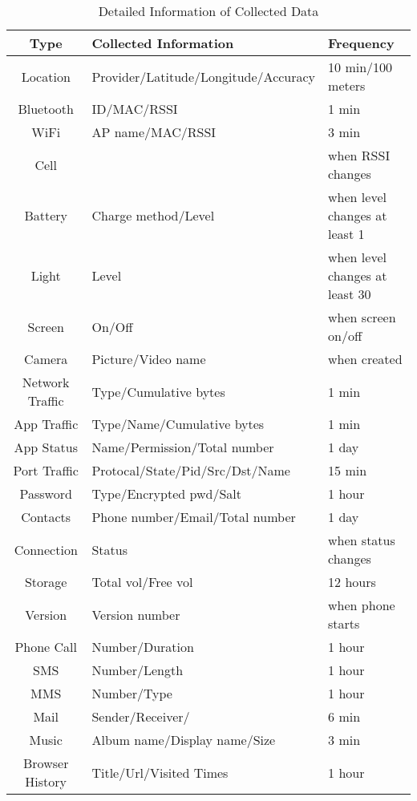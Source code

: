 \begin{table}[ht] 
\caption{Detailed Information of Collected Data } 
\centering  
\begin{tabular}{c|l|l}
\hline
		  Type			& Collected Information 					& Frequency \\ [0.5ex] 
\hline\hline Location			& Provider/Latitude/Longitude/Accuracy		& 10 min/100 meters	\\ 
\hline	  Bluetooth 		& ID/MAC/RSSI	    						& 1 min \\
\hline 	  WiFi 			& AP name/MAC/RSSI					& 3 min \\
\hline 	  Cell   			& 									& when RSSI changes \\
\hline	  Battery			& Charge method/Level	    				& when level changes at least 1 \\
\hline	  Light			& Level	    							& when level changes at least 30 \\
\hline	  Screen			& On/Off 							 	& when screen on/off \\
\hline 	  Camera			& Picture/Video name			        	        & when created	 \\
\hline 	  Network Traffic 	& Type/Cumulative bytes					& 1 min	 \\
\hline	  App Traffic		& Type/Name/Cumulative bytes			& 1 min \\
\hline	  App Status 		& Name/Permission/Total number			& 1 day \\
\hline 	  Port Traffic	        & Protocal/State/Pid/Src/Dst/Name			& 15 min \\
\hline 	  Password	  	& Type/Encrypted pwd/Salt				& 1 hour \\
\hline 	  Contacts			& Phone number/Email/Total number		& 1 day \\
\hline 	  Connection		& Status								& when status changes \\
\hline 	  Storage			& Total vol/Free vol						& 12 hours \\
\hline 	  Version			& Version number							& when phone starts \\
\hline 	  Phone Call		& Number/Duration						& 1 hour \\
\hline 	  SMS			& Number/Length						& 1 hour \\
\hline 	  MMS			& Number/Type						& 1 hour \\
\hline 	  Mail			& Sender/Receiver/						& 6 min \\
\hline 	  Music			& Album name/Display name/Size			& 3 min \\
\hline 	  Browser History	& Title/Url/Visited Times					& 1 hour \\
\hline
\end{tabular}
\label{table:detailed_data} 
\end{table}
